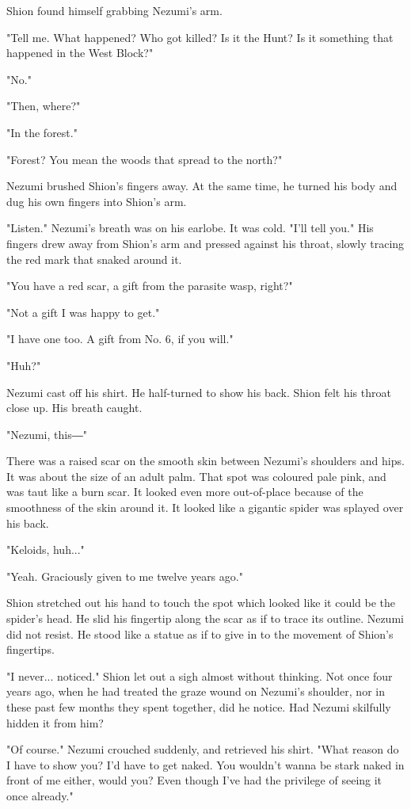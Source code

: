 Shion found himself grabbing Nezumi's arm.

"Tell me. What happened? Who got killed? Is it the Hunt? Is it something
that happened in the West Block?"

"No."

"Then, where?"

"In the forest."

"Forest? You mean the woods that spread to the north?"

Nezumi brushed Shion's fingers away. At the same time, he turned his
body and dug his own fingers into Shion's arm.

"Listen." Nezumi's breath was on his earlobe. It was cold. "I'll tell
you." His fingers drew away from Shion's arm and pressed against his
throat, slowly tracing the red mark that snaked around it.

"You have a red scar, a gift from the parasite wasp, right?"

"Not a gift I was happy to get."

"I have one too. A gift from No. 6, if you will."

"Huh?"

Nezumi cast off his shirt. He half-turned to show his back. Shion felt
his throat close up. His breath caught.

"Nezumi, this―"

There was a raised scar on the smooth skin between Nezumi's shoulders
and hips. It was about the size of an adult palm. That spot was coloured
pale pink, and was taut like a burn scar. It looked even more
out-of-place because of the smoothness of the skin around it. It looked
like a gigantic spider was splayed over his back.

"Keloids, huh..."

"Yeah. Graciously given to me twelve years ago."

Shion stretched out his hand to touch the spot which looked like it
could be the spider's head. He slid his fingertip along the scar as if
to trace its outline. Nezumi did not resist. He stood like a statue as
if to give in to the movement of Shion's fingertips.

"I never... noticed." Shion let out a sigh almost without thinking. Not
once four years ago, when he had treated the graze wound on Nezumi's
shoulder, nor in these past few months they spent together, did he
notice. Had Nezumi skilfully hidden it from him?

"Of course." Nezumi crouched suddenly, and retrieved his shirt. "What
reason do I have to show you? I'd have to get naked. You wouldn't wanna
be stark naked in front of me either, would you? Even though I've had
the privilege of seeing it once already."

